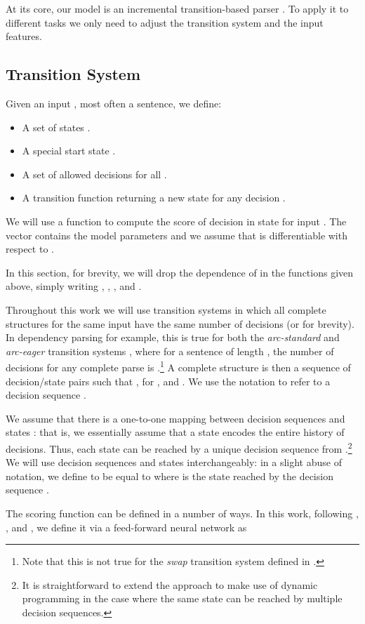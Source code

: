 \documentclass[11pt]{article}
\newcommand{\denselist}{\setlength{\itemsep}{1pt}
  \setlength{\parskip}{0pt} \setlength{\parsep}{0pt}}
\newcommand{\bitem}{\begin{itemize}[noitemsep,topsep=2pt]\denselist}
\newcommand{\eitem}{\end{itemize}}
\begin{document}
At its core, our model is an incremental transition-based parser \cite{Nivre:2006}.
To apply it to different tasks we only need to adjust
the transition system and the input features.

\subsection{Transition System}

Given an input , most often a sentence, we define:
\bitem
\item A set of states .
\item A special start state .
\item A set of allowed decisions  for all .
\item A transition function  returning a new state  for
  any decision .
\eitem 
We will use a function
 to compute the score of decision  in state
 for input . The vector  contains the model parameters and we assume
that  is differentiable with respect to
.

In this section, for brevity, we will drop the dependence of 
in the functions given above, simply writing , , , and .

Throughout this work we will use transition systems in which all
complete structures for the same input  have the same number of
decisions  (or  for brevity).  In dependency parsing for
example, this is true for both the {\em arc-standard} and {\em
  arc-eager} transition systems \cite{Nivre:2006}, where for a
sentence  of length , the number of decisions for any complete
parse is .\footnote{Note that this is not true for
  the {\em swap} transition system defined in
  .}  
A complete structure is then a sequence of decision/state pairs  such that ,  for
, and .
We use the notation  to refer to a decision
sequence .

We assume that there is a
one-to-one mapping between decision sequences  and
states : that is, we essentially assume that a state
encodes the entire history of decisions.
Thus, each state can be reached by a unique decision
sequence from .\footnote{It is straightforward to extend the
  approach to make use of dynamic programming in the case where the
  same state can be reached by multiple decision sequences.}
We will use decision sequences  and states
interchangeably: in a slight abuse of notation, we define
 to be equal to  where  is the
state reached by the decision sequence .

The scoring function  can be defined in a number
of ways. 
In this work, following , ,
and ,
we define it via a feed-forward neural network as
\end{document}
